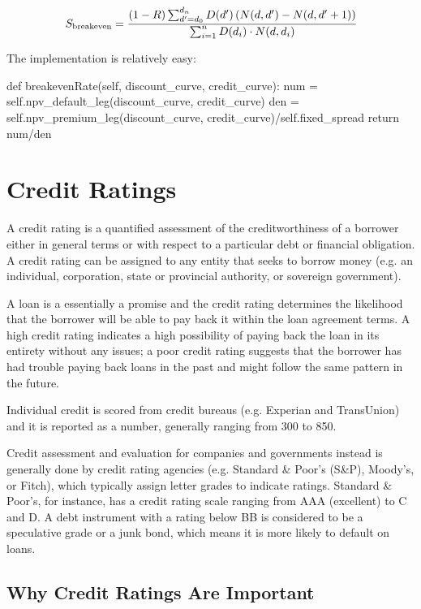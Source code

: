 \begin{equation}
S_{\mathrm{breakeven}} = \cfrac{(1-R) \sum_{d'=d_0}^{d_n} D(d') \left( N(d, d') - N(d, d'+1) \right)}{\sum_{i=1}^{n} D(d_i) \cdot N(d, d_i)}
\end{equation}

The implementation is relatively easy:

\begin{ipython}
def breakevenRate(self, discount_curve, credit_curve):
    num = self.npv_default_leg(discount_curve, credit_curve)
    den = self.npv_premium_leg(discount_curve, credit_curve)/self.fixed_spread
    return num/den
\end{ipython}

\section{Credit Ratings}\label{credit-ratings}

A credit rating is a quantified assessment of the creditworthiness of a
borrower either in general terms or with respect to a particular debt or
financial obligation. A credit rating can be assigned to any entity that
seeks to borrow money (e.g. an individual, corporation, state or
provincial authority, or sovereign government).

A loan is a essentially a promise and the credit rating determines the
likelihood that the borrower will be able to pay back it within the loan
agreement terms. A high credit rating indicates a high possibility of
paying back the loan in its entirety without any issues; a poor credit
rating suggests that the borrower has had trouble paying back loans in
the past and might follow the same pattern in the future.

Individual credit is scored from credit bureaus (e.g. Experian and
TransUnion) and it is reported as a number, generally ranging from 300
to 850.

Credit assessment and evaluation for companies and governments instead
is generally done by credit rating agencies (e.g. Standard \& Poor's
(S\&P), Moody's, or Fitch), which typically assign letter grades to
indicate ratings. Standard \& Poor's, for instance, has a credit rating
scale ranging from AAA (excellent) to C and D. A debt instrument with a
rating below BB is considered to be a speculative grade or a junk bond,
which means it is more likely to default on loans.

\subsection{Why Credit Ratings Are Important}\label{why-credit-ratings-are-important}

